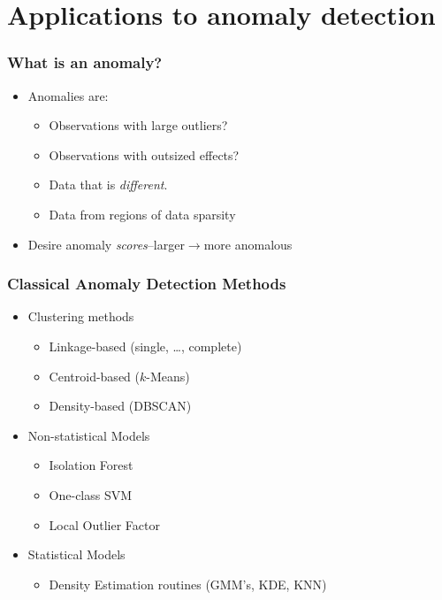 \documentclass[aspectratio=169]{beamer}
\begin{document}
\section[Anomaly]{Applications to anomaly detection}

\begin{frame}
  \frametitle{What is an anomaly?}
  \begin{itemize}
    \item Anomalies are:
      \begin{itemize}
        \item Observations with large outliers?
        \item Observations with outsized effects?
        \item Data that is \emph{different}.
        \item Data from regions of data sparsity
      \end{itemize}
    \item Desire anomaly \emph{scores}--larger$\rightarrow$more anomalous
  \end{itemize}
\end{frame}

\begin{frame}
  \frametitle{Classical Anomaly Detection Methods}
  \begin{itemize}
    \item Clustering methods
      \begin{itemize}
        \item Linkage-based (single, \dots, complete)~\citep{ackerman2010}
        \item Centroid-based ($k$-Means)~\citep{hartigan1979} 
        \item Density-based (DBSCAN)~\cite{ester1996}
      \end{itemize}
    \item Non-statistical Models
      \begin{itemize}
        \item Isolation Forest~\citep{liu2000}
        \item One-class SVM~\cite{chang2011}
        \item Local Outlier Factor~\cite{breunig2000}
      \end{itemize}
    \item Statistical Models
      \begin{itemize}
        \item Density Estimation routines (GMM's, KDE, KNN)
      \end{itemize}
  \end{itemize}
\end{frame}
\end{document}
